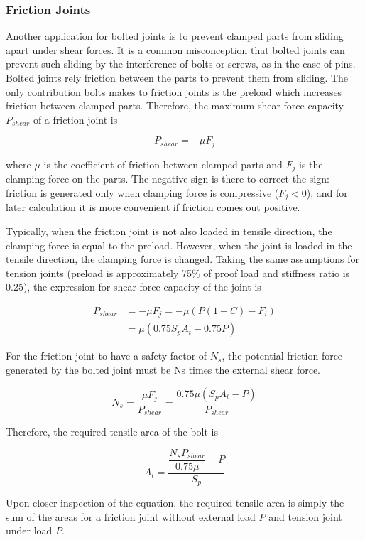 \documentclass[a4paper,openany,nobib]{tufte-book}
\begin{document}
{{\subsubsection{Friction Joints}
\label{friction-joints}
Another application for bolted joints is to prevent clamped parts from
sliding apart under shear forces. It is a common misconception that
bolted joints can prevent such sliding by the interference of bolts or
screws, as in the case of pins. Bolted joints rely friction between the
parts to prevent them from sliding. The only contribution bolts makes to
friction joints is the preload which increases friction between clamped
parts. Therefore, the maximum shear force capacity \(P_{shear}\) of a
friction joint is


$$P_{shear} = -\mu F_j$$

where \(\mu\) is the coefficient of friction between clamped parts and
\(F_j\) is the clamping force on the parts. The negative sign is there to
correct the sign: friction is generated only when clamping force is
compressive (\(F_j < 0\)), and for later calculation it is more convenient
if friction comes out positive.

Typically, when the friction joint is not also loaded in tensile
direction, the clamping force is equal to the preload. However, when the
joint is loaded in the tensile direction, the clamping force is changed.
Taking the same assumptions for tension joints (preload is approximately
75\% of proof load and stiffness ratio is 0.25), the expression for shear
force capacity of the joint is

$$\begin{aligned}
  P_{shear} &= -\mu F_j = -\mu \left( P(1 - C) - F_i \right) \\
            &= \mu (0.75S_pA_t - 0.75P)\end{aligned}$$

For the friction joint to have a safety factor of \(N_s\), the potential
friction force generated by the bolted joint must be Ns times the
external shear force.

$$N_s = \frac{\mu F_j}{P_{shear}} = \frac{0.75\mu (S_pA_t - P)}{P_{shear}}$$

Therefore, the required tensile area of the bolt is

$$A_t = \frac{\dfrac{N_s P_{shear}}{0.75\mu } + P}{S_p}$$

Upon closer inspection of the equation, the required tensile area is
simply the sum of the areas for a friction joint without external load
\(P\) and tension joint under load \(P\).

}}
\end{document}

